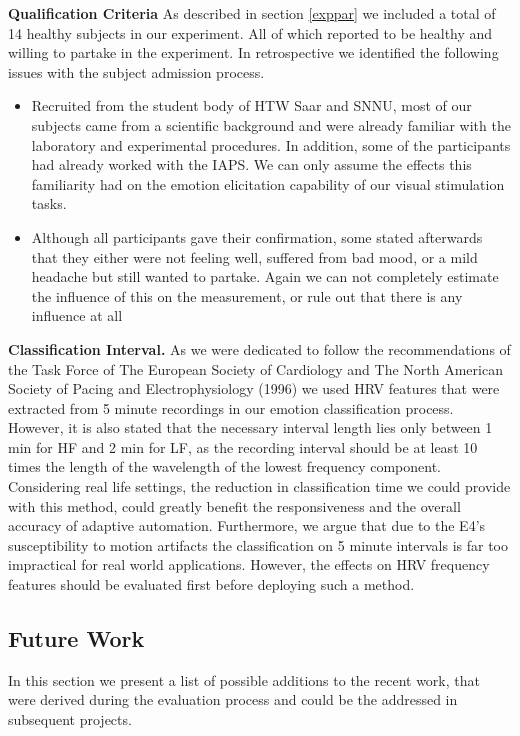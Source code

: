 \textbf{Qualification Criteria}
As described in section \ref{exppar} we included a total of 14 healthy subjects in our experiment. All of which reported to be healthy and willing to partake in the experiment. In retrospective we identified the following issues with the subject admission process.
\begin{itemize}
\item Recruited from the student body of HTW Saar and SNNU, most of our subjects came from a scientific background and were already familiar with the laboratory and experimental procedures. In addition, some of the participants had already worked with the IAPS. We can only assume the effects this familiarity had on the emotion elicitation capability of our visual stimulation tasks.
\item Although all participants gave their confirmation, some stated afterwards that they either were not feeling well, suffered from bad mood, or a mild headache but still wanted to partake. Again we can not completely estimate the influence of this on the measurement, or rule out that there is any influence at all
\end{itemize}
\textbf{Classification Interval.}
As we were dedicated to follow the recommendations of the Task Force of The European Society of Cardiology and The North American Society of Pacing and Electrophysiology (1996) we used HRV features that were extracted from 5 minute recordings in our emotion classification process. However, it is also stated that the necessary interval length lies only between 1 min for HF and 2 min for LF, as the recording interval should be at least 10 times the length of the wavelength of the lowest frequency component. Considering real life settings, the reduction in classification time we could provide with this method, could greatly benefit the responsiveness and the overall accuracy of adaptive automation. Furthermore, we argue that due to the E4's susceptibility to motion artifacts the classification on 5 minute intervals is far too impractical for real world applications. However, the effects on HRV frequency features should be evaluated first before deploying such a method.
\subsection{Future Work}
In this section we present a list of possible additions to the recent work, that were derived during the evaluation process and could be the addressed in subsequent projects.

